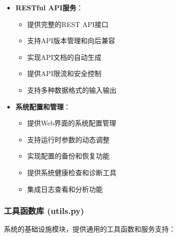 \documentclass[12pt,a4paper]{article}
\begin{document}
\begin{itemize}
    \item \textbf{RESTful API服务}：
        \begin{itemize}
            \item 提供完整的REST API接口
            \item 支持API版本管理和向后兼容
            \item 实现API文档的自动生成
            \item 提供API限流和安全控制
            \item 支持多种数据格式的输入输出
        \end{itemize}
    
    \item \textbf{系统配置和管理}：
        \begin{itemize}
            \item 提供Web界面的系统配置管理
            \item 支持运行时参数的动态调整
            \item 实现配置的备份和恢复功能
            \item 提供系统健康检查和诊断工具
            \item 集成日志查看和分析功能
        \end{itemize}
\end{itemize}

\subsubsection{工具函数库 (utils.py)}
系统的基础设施模块，提供通用的工具函数和服务支持：
\end{document}
